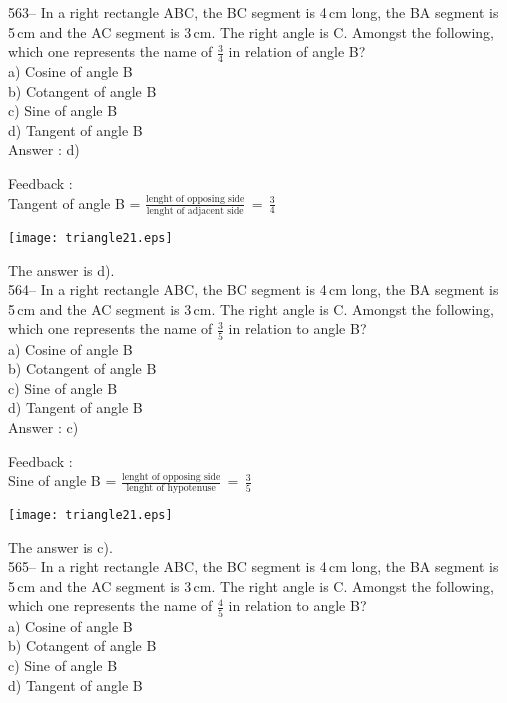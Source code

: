 \documentclass[letterpaper, 12pt]{article}
\begin{document}
563-- In a right rectangle ABC, the BC segment is 4\,cm long, the BA segment is 5\,cm and the AC segment is 3\,cm. The right angle is C. Amongst the following, which one represents the name of $\frac{3}{4}$ in relation of angle B?\\
a) Cosine of angle B\\
b) Cotangent of angle B\\
c) Sine of angle B\\
d) Tangent of angle B\\

Answer : d)

Feedback : \\
Tangent of angle B = $\frac{\textrm{lenght of opposing side}}{\textrm{lenght of adjacent side}}\,=\,\frac{\textrm{3}}{\textrm{4}}$\\
\begin{center}
    \texttt{[image: triangle21.eps]}
    \end{center}
The answer is d).\\

564-- In a right rectangle ABC, the BC segment is 4\,cm long, the BA segment is 5\,cm and the AC segment is 3\,cm. The right angle is C. Amongst the following, which one represents the name of $\frac{3}{5}$ in relation to angle B?\\
a) Cosine of angle B\\
b) Cotangent of angle B\\
c) Sine of angle B\\
d) Tangent of angle B\\

Answer : c)

Feedback : \\
Sine of angle B = $\frac{\textrm{lenght of opposing side}}{\textrm{lenght of hypotenuse}}\,=\,\frac{\textrm{3}}{\textrm{5}}$\\
\begin{center}
    \texttt{[image: triangle21.eps]}
    \end{center}
The answer is c).\\

565-- In a right rectangle ABC, the BC segment is 4\,cm long, the BA segment is 5\,cm and the AC segment is 3\,cm. The right angle is C. Amongst the following, which one represents the name of $\frac{4}{5}$ in relation to angle B?\\
a) Cosine of angle B\\
b) Cotangent of angle B\\
c) Sine of angle B\\
d) Tangent of angle B\\
\end{document}
